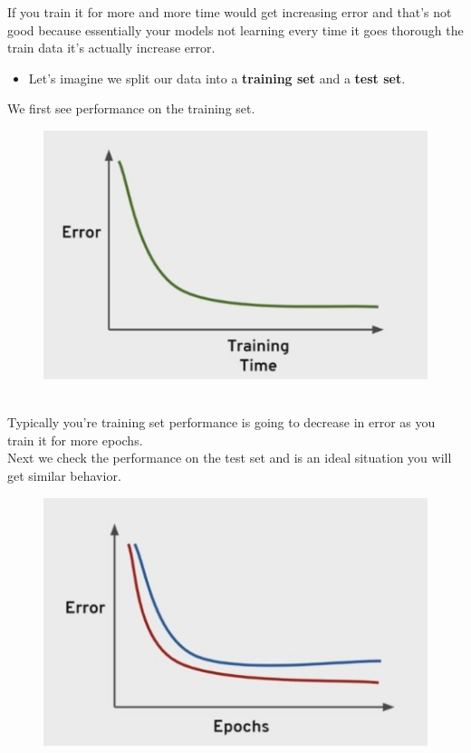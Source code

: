 \documentclass[12pt]{article}
\begin{document}
\begin{itemize}
	If you train it for more and more time would get increasing error and that's not good because essentially your models not learning every time it goes thorough the train data it's actually increase error.
	
	\newpage
	\begin{itemize}
		\item

		\Large Let's imagine we split our data into a \textbf{training set} and a \textbf{test set}.
	\end{itemize}
	
	\small
	
	We first see performance on the training set.
\begin{figure}[htbp]
\centerline{\includegraphics[scale=.5]{img/underfittingGoodModel.jpg}}
\end{figure}\\
	Typically you're training set performance is going to decrease in error as you train it for more epochs.\\
	
	Next we check the performance on the test set and is an ideal situation you will get similar behavior.
\begin{figure}[htbp]
\centerline{\includegraphics[scale=.5]{img/testset.jpg}}
\end{figure}\\


\end{itemize}
\end{document}
